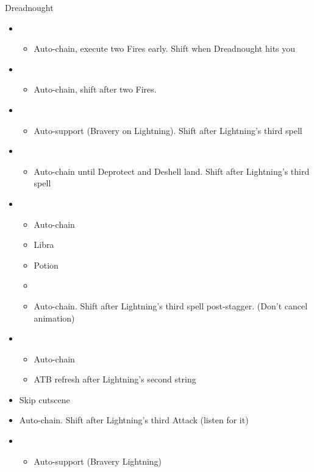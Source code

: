 \begin{battle}{Dreadnought}
\begin{multicols}{2}
\begin{itemize}
    \item \fourth
    \begin{itemize}
        \item Auto-chain, execute two Fires early. Shift when Dreadnought hits you
    \end{itemize}
    \item \fifth
    \begin{itemize}
        \item Auto-chain, shift after two Fires.
    \end{itemize}
    \item \sixth
    \begin{itemize}
        \item Auto-support (Bravery on Lightning). Shift after Lightning’s third spell
    \end{itemize}
    \item \fourth 
    \begin{itemize}
        \item Auto-chain until Deprotect and Deshell land. Shift after Lightning’s third spell
    \end{itemize}
    \item \fifth
    \begin{itemize}
        \item Auto-chain
        \item Libra
        \item Potion
        \item \stagger
        \item Auto-chain. Shift after Lightning’s third spell post-stagger. (Don't cancel animation)
    \end{itemize}
    \item \first
    \begin{itemize}
        \item Auto-chain
        \item ATB refresh after Lightning's second string
    \end{itemize}
    \item Skip cutscene
    \columnbreak
    \item Auto-chain. Shift after Lightning’s third Attack (listen for it)
    \item \sixth
    \begin{itemize}
        \item Auto-support (Bravery Lightning)

\end{itemize}
\end{itemize}
\end{multicols}
\end{battle}
